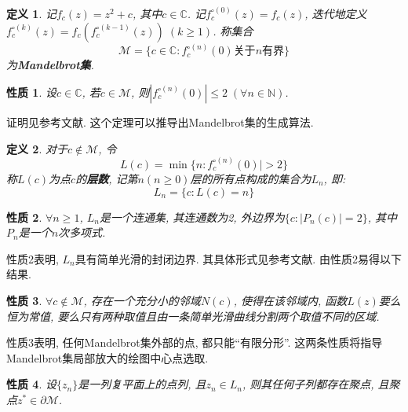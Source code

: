\documentclass[UTF8]{ctexart}
\newtheorem{definition}{定义}
\newtheorem{property}{性质}
\begin{document}
\begin{definition}
    记$f_c(z)=z^2+c$, 其中$c\in\mathbb{C}$. 记$f_c^{\circ(0)}(z)=f_c(z)$, 迭代地定义$f^{\circ(k)}_c(z)=f_c(f^{\circ(k-1)}_c(z))\;(k\geq 1)$. 称集合
    \begin{equation*}
        \mathcal{M}=\{c\in\mathbb{C}:f_c^{\circ(n)}(0)\text{关于}n\text{有界}\}
    \end{equation*}
    为\textbf{Mandelbrot集}.
\end{definition}

\begin{property}
    设$c\in\mathbb{C}$, 若$c\in\mathcal{M}$, 则$|f_c^{\circ(n)}(0)|\leq 2\;(\forall n\in\mathbb{N})$.
\end{property}

证明见参考文献\cite{branner1989mandelbrot}. 这个定理可以推导出Mandelbrot集的生成算法. 

\begin{definition}
    对于$c\notin \mathcal{M}$, 令
    \begin{equation}
        L(c)=\min\{n:f_c^{\circ(n)}(0)|> 2\}
    \end{equation}
    称$L(c)$为点$c$的\textbf{层数}, 记第$n(n\geq 0)$层的所有点构成的集合为$L_n$, 即: 
    \begin{equation}
        L_n=\{c:L(c)=n\}
    \end{equation}
\end{definition}

\begin{property}
    $\forall n\geq 1$, $L_n$是一个连通集, 其连通数为2, 外边界为$\{c:|P_{n}(c)|=2\}$, 其中$P_n$是一个$n$次多项式.
\end{property}

性质2表明, $L_n$具有简单光滑的封闭边界. 其具体形式见参考文献\cite{张国栋2005Mandelbrot}. 由性质2易得以下结果.

\begin{property}
    $\forall c\notin \mathcal{M}$, 存在一个充分小的邻域$N(c)$, 使得在该邻域内, 函数$L(z)$要么恒为常值, 要么只有两种取值且由一条简单光滑曲线分割两个取值不同的区域.
\end{property}

性质3表明, 任何Mandelbrot集外部的点, 都只能“有限分形”. 这两条性质将指导Mandelbrot集局部放大的绘图中心点选取.

\begin{property}
    设$\{z_n\}$是一列复平面上的点列, 且$z_n\in L_n$, 则其任何子列都存在聚点, 且聚点$z^*\in \partial \mathcal{M}$.
\end{property}
\end{document}
